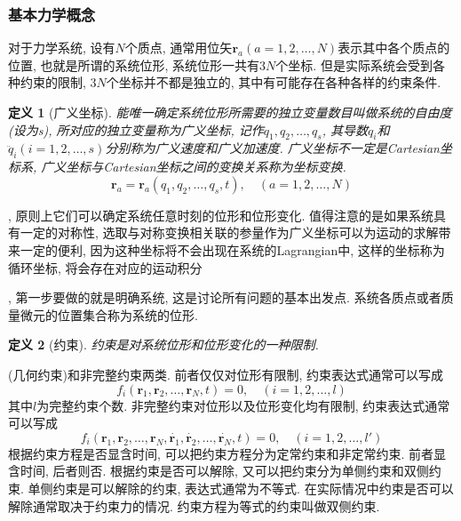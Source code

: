 \documentclass[a4paper,11pt]{article}
\newtheorem{definition}{\hspace{2em}定义}[section]
\begin{document}
\subsubsection{基本力学概念}
对于力学系统, 设有$N$个质点, 通常用位矢$\mathbf{r}_a(a=1,2,\dots,N)$表示其中各个质点的位置, 也就是所谓的系统位形, 系统位形一共有$3N$个坐标. 但是实际系统会受到各种约束的限制, $3N$个坐标并不都是独立的, 其中有可能存在各种各样的约束条件.
\begin{definition}[广义坐标]
  能唯一确定系统位形所需要的独立变量数目叫做系统的自由度(设为s), 所对应的独立变量称为广义坐标, 记作$q_1,q_2,\dots,q_s$, 其导数$\dot{q}_i$和$\ddot{q}_i(i=1,2,\dots,s)$分别称为广义速度和广义加速度. 广义坐标不一定是Cartesian坐标系, 广义坐标与Cartesian坐标之间的变换关系称为坐标变换.
\begin{equation*}
  \mathbf{r}_a=\mathbf{r}_a(q_1,q_2,\dots,q_s,t),\quad (a=1,2,\dots,N)
\end{equation*}
\end{definition}
, 原则上它们可以确定系统任意时刻的位形和位形变化. 值得注意的是如果系统具有一定的对称性, 选取与对称变换相关联的参量作为广义坐标可以为运动的求解带来一定的便利, 因为这种坐标将不会出现在系统的Lagrangian中, 这样的坐标称为循环坐标, 将会存在对应的运动积分

, 第一步要做的就是明确系统, 这是讨论所有问题的基本出发点. 系统各质点或者质量微元的位置集合称为系统的位形.
\begin{definition}[约束]
  约束是对系统位形和位形变化的一种限制.
\end{definition}
(几何约束)和非完整约束两类. 前者仅仅对位形有限制, 约束表达式通常可以写成
\begin{equation*}
  f_i(\mathbf{r}_1,\mathbf{r}_2,\dots,\mathbf{r}_N,t)=0,\quad (i=1,2,\dots,l)
\end{equation*}
其中$l$为完整约束个数. 非完整约束对位形以及位形变化均有限制, 约束表达式通常可以写成
\begin{equation*}
  f_i(\mathbf{r}_1,\mathbf{r}_2,\dots,\mathbf{r}_N,\dot{\mathbf{r}_1},\dot{\mathbf{r}_2},\dots,\dot{\mathbf{r}_N},t)=0,\quad(i=1,2,\dots,l')
\end{equation*}
根据约束方程是否显含时间, 可以把约束方程分为定常约束和非定常约束. 前者显含时间, 后者则否. 根据约束是否可以解除, 又可以把约束分为单侧约束和双侧约束. 单侧约束是可以解除的约束, 表达式通常为不等式. 在实际情况中约束是否可以解除通常取决于约束力的情况. 约束方程为等式的约束叫做双侧约束.
\end{document}
